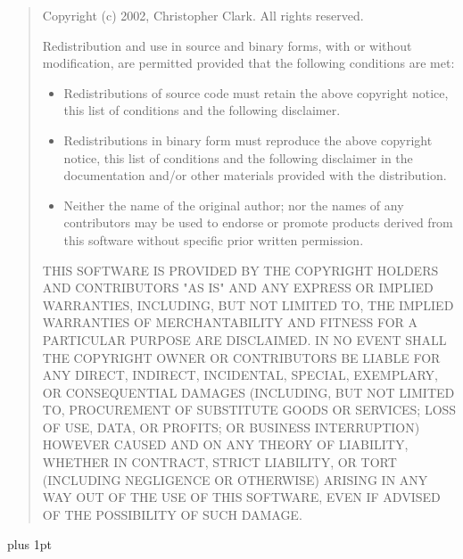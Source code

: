 \documentclass[11pt,twoside,final,openright]{report}
\begin{document}
\begin{quote}
Copyright (c) 2002, Christopher Clark.  All rights reserved.

Redistribution and use in source and binary forms, with or without
modification, are permitted provided that the following conditions are met:

\begin{itemize}
\item Redistributions of source code must retain the above copyright notice,
this list of conditions and the following disclaimer.

\item Redistributions in binary form must reproduce the above copyright
notice, this list of conditions and the following disclaimer in the
documentation and/or other materials provided with the distribution.

\item Neither the name of the original author; nor the names of any
contributors may be used to endorse or promote products derived from this
software without specific prior written permission.
\end{itemize}

THIS SOFTWARE IS PROVIDED BY THE COPYRIGHT HOLDERS AND CONTRIBUTORS "AS IS"
AND ANY EXPRESS OR IMPLIED WARRANTIES, INCLUDING, BUT NOT LIMITED TO, THE
IMPLIED WARRANTIES OF MERCHANTABILITY AND FITNESS FOR A PARTICULAR PURPOSE ARE
DISCLAIMED.  IN NO EVENT SHALL THE COPYRIGHT OWNER OR CONTRIBUTORS BE LIABLE
FOR ANY DIRECT, INDIRECT, INCIDENTAL, SPECIAL, EXEMPLARY, OR CONSEQUENTIAL
DAMAGES (INCLUDING, BUT NOT LIMITED TO, PROCUREMENT OF SUBSTITUTE GOODS OR
SERVICES; LOSS OF USE, DATA, OR PROFITS; OR BUSINESS INTERRUPTION) HOWEVER
CAUSED AND ON ANY THEORY OF LIABILITY, WHETHER IN CONTRACT, STRICT LIABILITY,
OR TORT (INCLUDING NEGLIGENCE OR OTHERWISE) ARISING IN ANY WAY OUT OF THE USE
OF THIS SOFTWARE, EVEN IF ADVISED OF THE POSSIBILITY OF SUCH DAMAGE.
\end{quote}

\cleardoublepage


\pagestyle{plain}
{ \parskip 0pt plus 1pt
  \tableofcontents }
\cleardoublepage


\raggedbottom
{}
\parindent=0pt
\parskip=5pt
\renewcommand{\topfraction}{.8}
\renewcommand{\bottomfraction}{.8}
\renewcommand{\textfraction}{.2}
\renewcommand{\floatpagefraction}{.8}
\end{document}
